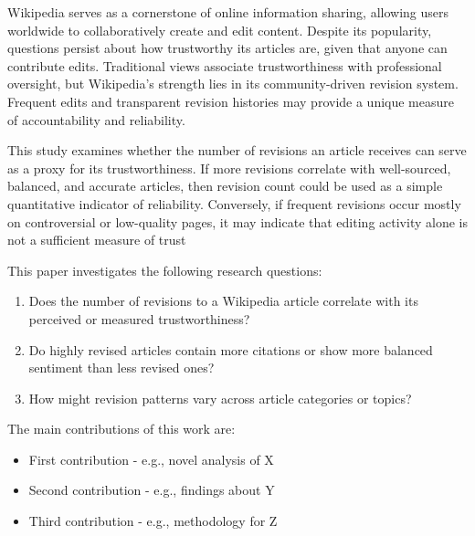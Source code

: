 


Wikipedia serves as a cornerstone of online information sharing, allowing users worldwide to collaboratively create and edit content. Despite its popularity, 
questions persist about how trustworthy its articles are, given that anyone can contribute edits. Traditional views associate trustworthiness with professional oversight, 
but Wikipedia’s strength lies in its community-driven revision system. Frequent edits and transparent revision histories may provide a unique measure of accountability and 
reliability.

This study examines whether the number of revisions an article receives can serve as a proxy for its trustworthiness. If more revisions correlate with well-sourced, 
balanced, and accurate articles, then revision count could be used as a simple quantitative indicator of reliability. Conversely, if frequent revisions occur mostly on 
controversial or low-quality pages, it may indicate that editing activity alone is not a sufficient measure of trust

This paper investigates the following research questions:
\begin{enumerate}
    \item Does the number of revisions to a Wikipedia article correlate with its perceived or measured trustworthiness?
    \item Do highly revised articles contain more citations or show more balanced sentiment than less revised ones?
    \item How might revision patterns vary across article categories or topics?
\end{enumerate}




The main contributions of this work are:
\begin{itemize}
    \item First contribution - e.g., novel analysis of X
    \item Second contribution - e.g., findings about Y
    \item Third contribution - e.g., methodology for Z
\end{itemize}

